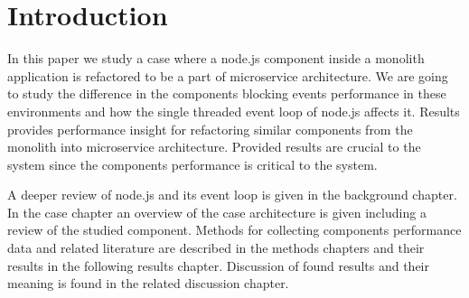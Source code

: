 \chapter{Introduction\label{intro}}
In this paper we study a case where a node.js component inside a monolith application is refactored to be a part of microservice architecture.
We are going to study the difference in the components blocking events performance in these environments and how the single threaded event loop of node.js affects it.
Results provides performance insight for refactoring similar components from the monolith into microservice architecture.
Provided results are crucial to the system since the components performance is critical to the system.

A deeper review of node.js and its event loop is given in the background chapter.
In the case chapter an overview of the case architecture is given including a review of the studied component.
Methods for collecting components performance data and related literature are described in the methods chapters and their results in the following results chapter.
Discussion of found results and their meaning is found in the related discussion chapter.

